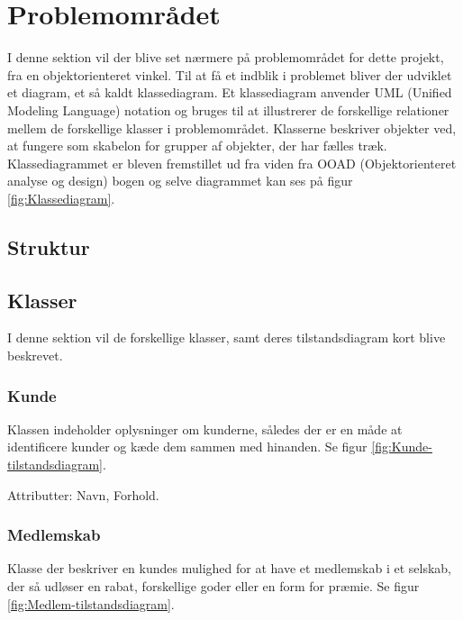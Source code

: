 \section{Problemområdet}
I denne sektion vil der blive set nærmere på problemområdet for dette projekt, fra en objektorienteret vinkel. Til at få et indblik i problemet bliver der udviklet et diagram, et så kaldt klassediagram. Et klassediagram anvender UML (Unified Modeling Language) notation og bruges til at illustrerer de forskellige relationer mellem de forskellige klasser i problemområdet. Klasserne beskriver objekter ved, at fungere som skabelon for grupper af objekter, der har fælles træk. Klassediagrammet er bleven fremstillet ud fra viden fra OOAD (Objektorienteret analyse og design) bogen \citep{ooaogd} og selve diagrammet kan ses på figur \ref{fig:Klassediagram}.

\begin{landscape}
\end{landscape}

\subsection{Struktur}


\subsection{Klasser}
I denne sektion vil de forskellige klasser, samt deres tilstandsdiagram kort blive beskrevet.

\subsubsection{Kunde}
Klassen indeholder oplysninger om kunderne, således der er en måde at identificere kunder og kæde dem sammen med hinanden. Se figur \ref{fig:Kunde-tilstandsdiagram}.

Attributter: Navn, Forhold.

\subsubsection{Medlemskab}
Klasse der beskriver en kundes mulighed for at have et medlemskab i et selskab, der så udløser en rabat, forskellige goder eller en form for præmie. Se figur \ref{fig:Medlem-tilstandsdiagram}.

